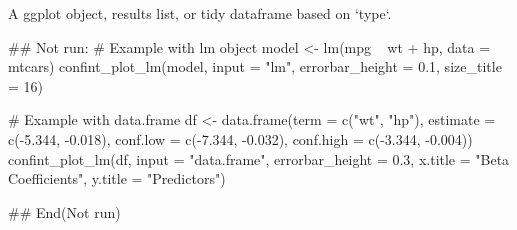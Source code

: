 \documentclass[a4paper]{book}
\begin{document}
%
\begin{Value}
A ggplot object, results list, or tidy dataframe based on `type`.
\end{Value}
%
\begin{Examples}
\begin{ExampleCode}
\#\# Not run: 
# Example with lm object
model <- lm(mpg ~ wt + hp, data = mtcars)
confint_plot_lm(model, input = "lm", errorbar_height = 0.1, size_title = 16)

# Example with data.frame
df <- data.frame(term = c("wt", "hp"), estimate = c(-5.344, -0.018),
                 conf.low = c(-7.344, -0.032), conf.high = c(-3.344, -0.004))
confint_plot_lm(df, input = "data.frame", errorbar_height = 0.3,
                x.title = "Beta Coefficients", y.title = "Predictors")

## End(Not run)
\end{ExampleCode}
\end{Examples}
\end{document}
